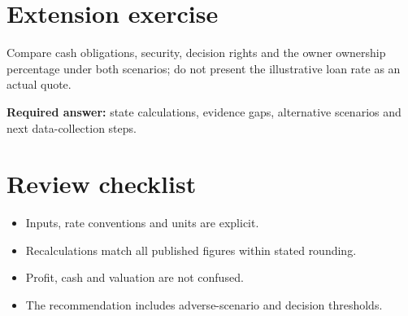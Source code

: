 \documentclass[11pt]{article}
\begin{document}
\section{Extension exercise}
Compare cash obligations, security, decision rights and the owner ownership percentage under both scenarios; do not present the illustrative loan rate as an actual quote.\par\textbf{Required answer:} state calculations, evidence gaps, alternative scenarios and next data-collection steps.
\section{Review checklist}
\begin{itemize}[leftmargin=*,itemsep=3pt]
\item Inputs, rate conventions and units are explicit.
\item Recalculations match all published figures within stated rounding.
\item Profit, cash and valuation are not confused.
\item The recommendation includes adverse-scenario and decision thresholds.
\end{itemize}
\end{document}
